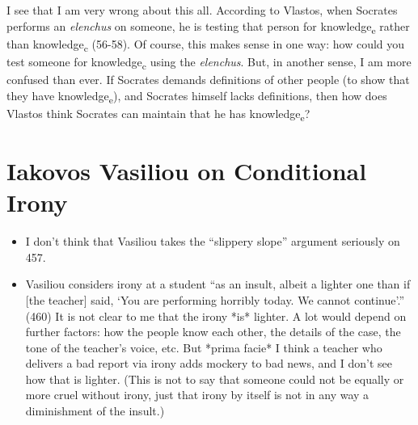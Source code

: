 \documentclass[12pt,letterpaper]{article}
\begin{document}
I see that I am very wrong about this all.
According to Vlastos, when Socrates performs an \textit{elenchus} on someone, he is testing that person for knowledge\textsubscript{e} rather than knowledge\textsubscript{c} (56-58).
Of course, this makes sense in one way: how could you test someone for knowledge\textsubscript{c} using the \textit{elenchus}.
But, in another sense, I am more confused than ever.
If Socrates demands definitions of other people (to show that they have knowledge\textsubscript{e}), and Socrates himself lacks definitions, then how does Vlastos think Socrates can maintain that he has knowledge\textsubscript{e}?


\section*{Iakovos Vasiliou on Conditional Irony}

\begin{itemize}
    \item I don't think that Vasiliou takes the ``slippery slope'' argument seriously on 457.
    \item Vasiliou considers irony at a student
        ``as an insult, albeit a lighter one than if [the teacher] said, `You are performing horribly today. We cannot continue'.'' (460)
        It is not clear to me that the irony *is* lighter.
        A lot would depend on further factors: how the people know each other, the details of the case, the tone of the teacher's voice, etc.
        But *prima facie* I think a teacher who delivers a bad report via irony adds mockery to bad news, and I don't see how that is lighter.
        (This is not to say that someone could not be equally or more cruel without irony, just that irony by itself is not in any way a diminishment of the insult.)
\end{itemize}

\newpage
\pagestyle{references}
\printbibliography[filter=sources,title={Ancient Sources: Editions, Translations, Commentaries}]
\printbibliography[filter=secondary,title=Secondary Literature]
\end{document}
